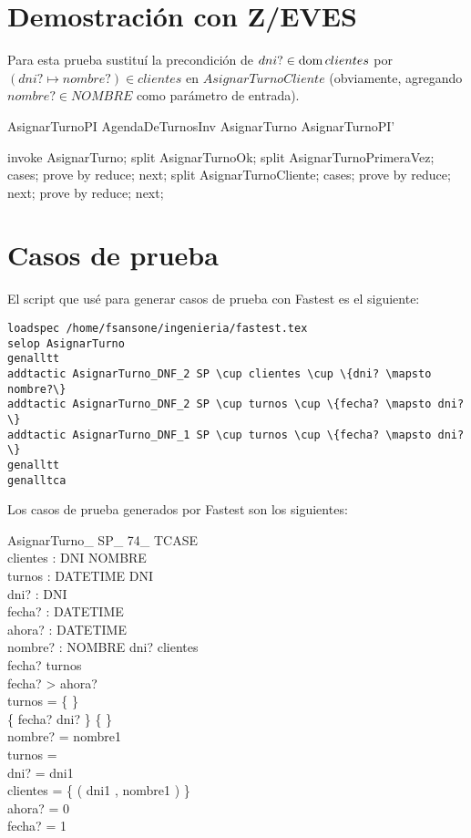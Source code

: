 \documentclass[%
  fleqn,colorlinks,linkcolor=blue,citecolor=blue,urlcolor=blue]{eptcs}
\begin{document}
\section{Demostraci\'on con Z/EVES}
Para esta prueba sustitu\'i{} la precondici\'on de $dni? \in \mathop{\mathrm{dom}} clientes$
por $(dni? \mapsto nombre?) \in clientes$ en $AsignarTurnoCliente$ (obviamente,
agregando $nombre? \in NOMBRE$ como par\'ametro de entrada).


\begin{theorem}{AsignarTurnoPI}
AgendaDeTurnosInv \land AsignarTurno \implies AsignarTurnoPI'
\end{theorem}

\begin{zproof}[AsignarTurnoPI]
invoke AsignarTurno;
split AsignarTurnoOk;
split AsignarTurnoPrimeraVez;
cases;
prove by reduce;
next;
split AsignarTurnoCliente;
cases;
prove by reduce;
next;
prove by reduce;
next;
\end{zproof}

\section{Casos de prueba}
El script que us\'e para generar casos de prueba con Fastest es el siguiente:
\begin{verbatim}
loadspec /home/fsansone/ingenieria/fastest.tex
selop AsignarTurno
genalltt
addtactic AsignarTurno_DNF_2 SP \cup clientes \cup \{dni? \mapsto nombre?\}
addtactic AsignarTurno_DNF_2 SP \cup turnos \cup \{fecha? \mapsto dni?\}
addtactic AsignarTurno_DNF_1 SP \cup turnos \cup \{fecha? \mapsto dni?\}
genalltt
genalltca
\end{verbatim}
Los casos de prueba generados por Fastest son los siguientes:

\begin{schema}{AsignarTurno\_ SP\_ 74\_ TCASE}\\
 clientes : DNI \pfun NOMBRE \\
 turnos : DATETIME \pfun DNI \\
 dni? : DNI \\
 fecha? : DATETIME \\
 ahora? : DATETIME \\
 nombre? : NOMBRE
\where
 dni? \in \dom clientes \\
 fecha? \notin \dom turnos \\
 fecha? > ahora? \\
 turnos = \{ \} \\
 \{ fecha? \mapsto dni? \} \neq \{ \} \\
 nombre? = nombre1 \\
 turnos =~\emptyset \\
 dni? = dni1 \\
 clientes = \{ ( dni1 , nombre1 ) \} \\
 ahora? = 0 \\
 fecha? = 1
\end{schema}
\end{document}

